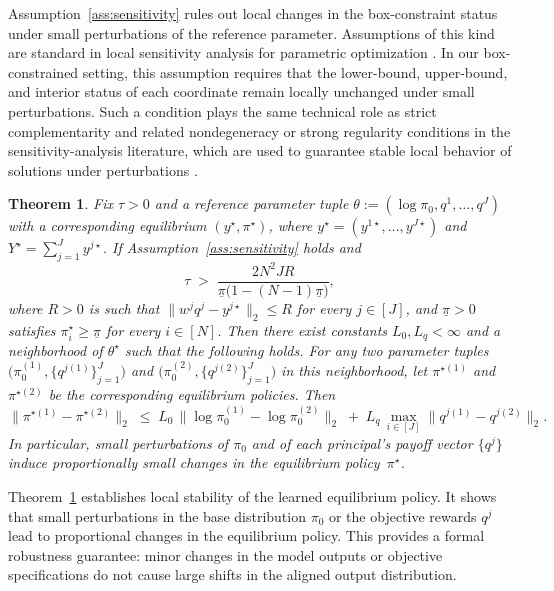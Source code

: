 \documentclass{article}
\newtheorem{theorem}{Theorem}
\begin{document}
Assumption~\ref{ass:sensitivity} rules out local changes in the box-constraint status under small perturbations of the reference parameter. Assumptions of this kind are standard in local sensitivity analysis for parametric optimization \citep{fiacco1990sensitivity,biegler2010nonlinear}. In our box-constrained setting, this assumption requires that the lower-bound, upper-bound, and interior status of each coordinate remain locally unchanged under small perturbations. Such a condition plays the same technical role as strict complementarity and related nondegeneracy or strong regularity conditions in the sensitivity-analysis literature, which are used to guarantee stable local behavior of solutions under perturbations \citep{robinson1980strongly,ghaffari2007active}.

\begin{theorem}
\label{thm:local-stability}
Fix $\tau>0$ and a reference parameter tuple
$\theta:=(\log\pi_0,q^{1},\dots,q^{J})$
with a corresponding equilibrium $(y^\star,\pi^\star)$, where
$y^\star=(y^{1\star},\dots,y^{J\star})$ and $Y^\star=\sum_{j=1}^J y^{j\star}$.
If Assumption~\ref{ass:sensitivity} holds and
\[
\tau \;>\; \frac{2N^2JR}{\underline{\pi}\bigl(1-(N-1)\underline{\pi}\bigr)},
\]
where \(R>0\) is such that \(\|w^j q^j-y^{j\star}\|_2 \le R\) for every \(j\in[J]\), and \(\underline{\pi}>0\) satisfies \(\pi_i^\star \ge \underline{\pi}\) for every \(i\in[N]\). 
Then there exist constants $L_0,L_q<\infty$ and a neighborhood of $\theta^\star$ such that the following holds.
For any two parameter tuples
\(
\Big(\pi_0^{(1)},\{q^{j(1)}\}_{j=1}^J\Big)
\) and \(
\Big(\pi_0^{(2)},\{q^{j(2)}\}_{j=1}^J\Big)
\)
in this neighborhood, let $\pi^{\star(1)}$ and $\pi^{\star(2)}$ be the corresponding equilibrium policies.
Then
\[
\bigl\|\pi^{\star(1)}-\pi^{\star(2)}\bigr\|_2
\;\le\;
L_0\,
\bigl\|\log \pi_0^{(1)}-\log \pi_0^{(2)}\bigr\|_2
\;+\;
L_q\,\max_{i\in[J]}
\bigl\|q^{j(1)}-q^{j(2)}\bigr\|_2.
\]
In particular, small perturbations of $\pi_0$ and of each principal's payoff vector $\{q^j\}$
induce proportionally small changes in the equilibrium policy~$\pi^\star$.
\end{theorem}

Theorem~\ref{thm:local-stability} establishes local stability of the learned equilibrium policy. It shows that small perturbations in the base distribution \(\pi_0\) or the objective rewards \(q^j\) lead to proportional changes in the equilibrium policy. This provides a formal robustness guarantee: minor changes in the model outputs or objective specifications do not cause large shifts in the aligned output distribution.
\end{document}
